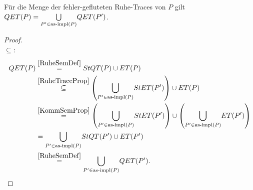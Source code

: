 \begin{Prop}
  \label{RuheSemProp}
  Für die Menge der fehler-gefluteten Ruhe-Traces von $P$ gilt $QET (P) =
  \underset{P'\in\mathrm{as}\text{-}\mathrm{impl} (P)}{\bigcup} QET (P')$.
\end{Prop}
\begin{proof}\mbox{}\\
  \glqq$\subseteq$\grqq{}:
  \begin{align*}
    QET (P)&\overset{\ref{RuheSemDef}}{=} StQT (P) \cup ET (P)\\
    &\overset{\ref{RuheTraceProp}}{\subseteq} \left(\underset{P'\in\mathrm{as}\text{-}\mathrm{impl}
    (P)}{\bigcup} StET (P')\right)\cup ET (P)\\
    &\overset{\ref{KommSemProp}}{=} \left(\underset{P'\in\mathrm{as}\text{-}\mathrm{impl}
    (P)}{\bigcup} StET (P')\right)\cup \left(\underset{P'\in\mathrm{as}\text{-}\mathrm{impl}
    (P)}{\bigcup} ET (P')\right)\\
    &= \underset{P'\in\mathrm{as}\text{-}\mathrm{impl} (P)}{\bigcup} StQT (P') \cup ET (P')\\
    &\overset{\ref{RuheSemDef}}{=} \underset{P'\in\mathrm{as}\text{-}\mathrm{impl} (P)}{\bigcup} QET
    (P').\\
  \end{align*}


\end{proof}

